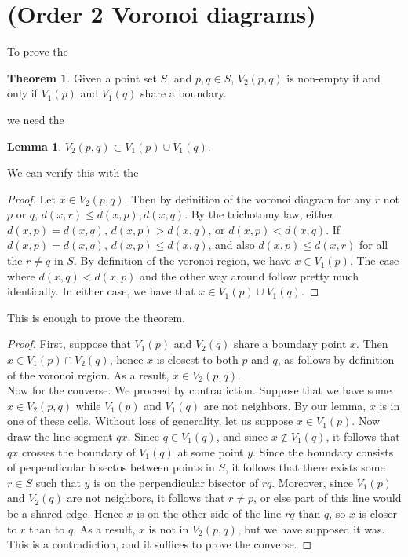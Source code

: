 \documentclass[12pt]{article}
\theoremstyle{definition}
\newtheorem{lemma}{Lemma}
\newtheorem{theorem}{Theorem}
\begin{document}
\section{(Order 2 Voronoi diagrams)}
To prove the 
\begin{theorem}
Given a point set $S$, and $p,q\in S$, $V_2(p,q)$ is non-empty if and only if $V_1(p)$ and $V_1(q)$ share a boundary.  
\end{theorem}

we need the 
\begin{lemma}
$V_2(p,q) \subset V_1(p)\cup V_1(q)$.
\end{lemma}

We can verify this with the

\begin{proof}

Let $x\in V_2(p,q)$. Then by definition of the voronoi diagram for any $r$ not $p$ or $q$, $d(x,r) \le d(x,p), d(x,q)$. By the trichotomy law, either $d(x,p) = d(x,q)$, $d(x,p) > d(x,q)$, or $d(x,p) < d(x,q)$. If $d(x,p) = d(x,q)$, $d(x,p)\le d(x,q)$, and also $d(x,p) \le d(x,r)$ for all the $r\ne q$ in $S$. By definition of the voronoi region, we have $x\in V_1(p)$. The case where $d(x,q) < d(x,p)$ and the other way around follow pretty much identically. In either case, we have that $x\in V_1(p)\cup V_1(q)$. 

\end{proof}

This is enough to prove the theorem.

\begin{proof}
First, suppose that $V_1(p)$ and $V_2(q)$ share a boundary point $x$. Then $x\in V_1(p)\cap V_2(q)$, hence $x$ is closest to both $p$ and $q$, as follows by definition of the voronoi region. As a result, $x\in V_2(p,q)$.\\

Now for the converse. We proceed by contradiction. Suppose that we have some $x\in V_2(p,q)$ while $V_1(p)$ and $V_1(q)$ are not neighbors. By our lemma, $x$ is in one of these cells. Without loss of generality, let us suppose $x\in V_1(p)$. Now draw the line segment $qx$. Since $q\in V_1(q)$, and since $x\not \in V_1(q)$, it follows that $qx$ crosses the boundary of $V_1(q)$ at some point $y$. Since the boundary consists of perpendicular bisectos between points in $S$, it follows that there exists some $r\in S$ such that $y$ is on the perpendicular bisector of $rq$. Moreover, since $V_1(p)$ and $V_2(q)
$ are not neighbors, it follows that $r\ne p$, or else part of this line would be a shared edge. Hence $x$ is on the other side of the line $rq$ than $q$, so $x$ is closer to $r$ than to $q$. As a result, $x$ is not in $V_2(p,q)$, but we have supposed it was. This is a contradiction, and it suffices to prove the converse.
 \end{proof}
\end{document}
